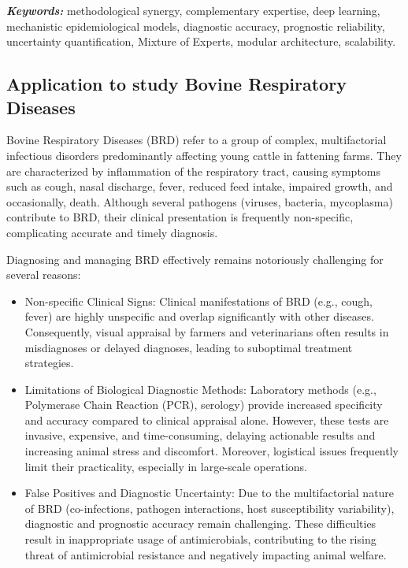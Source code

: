 \textit{\textbf{Keywords:}} methodological synergy, complementary expertise, deep learning, mechanistic epidemiological models, diagnostic accuracy, prognostic reliability, uncertainty quantification, Mixture of Experts, modular architecture, scalability.

\subsection{Application to study Bovine Respiratory Diseases}

Bovine Respiratory Diseases (BRD) refer to a group of complex, multifactorial infectious disorders predominantly affecting young cattle in fattening farms. They are characterized by inflammation of the respiratory tract, causing symptoms such as cough, nasal discharge, fever, reduced feed intake, impaired growth, and occasionally, death. Although several pathogens (viruses, bacteria, mycoplasma) contribute to BRD, their clinical presentation is frequently non-specific, complicating accurate and timely diagnosis.

Diagnosing and managing BRD effectively remains notoriously challenging for several reasons:
\begin{itemize}
    \item Non-specific Clinical Signs: Clinical manifestations of BRD (e.g., cough, fever) are highly unspecific and overlap significantly with other diseases. Consequently, visual appraisal by farmers and veterinarians often results in misdiagnoses or delayed diagnoses, leading to suboptimal treatment strategies.
    \item Limitations of Biological Diagnostic Methods: Laboratory methods (e.g., Polymerase Chain Reaction (PCR), serology) provide increased specificity and accuracy compared to clinical appraisal alone. However, these tests are invasive, expensive, and time-consuming, delaying actionable results and increasing animal stress and discomfort. Moreover, logistical issues frequently limit their practicality, especially in large-scale operations.
    \item False Positives and Diagnostic Uncertainty: Due to the multifactorial nature of BRD (co-infections, pathogen interactions, host susceptibility variability), diagnostic and prognostic accuracy remain challenging. These difficulties result in inappropriate usage of antimicrobials, contributing to the rising threat of antimicrobial resistance and negatively impacting animal welfare.
\end{itemize}

